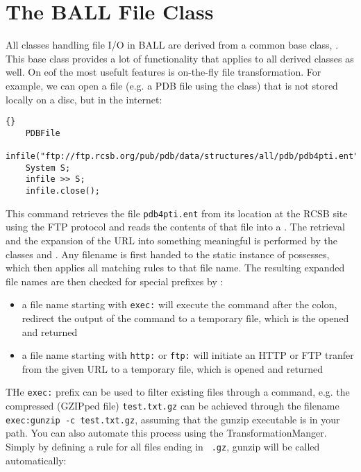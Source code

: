 \section{The BALL File Class}

All classes handling file I/O in BALL are derived from a common
base class, . This base class provides a lot of
functionality that applies to all derived classes as well.
On eof the most usefult features is on-the-fly file transformation.
For example, we can open a file (e.g. a PDB file using the  
class) that is not stored locally on a disc, but in the internet:

\begin{lstlisting}{}
	PDBFile
	infile("ftp://ftp.rcsb.org/pub/pdb/data/structures/all/pdb/pdb4pti.ent");
	System S;
	infile >> S;
	infile.close();
\end{lstlisting}

\noindent
This command retrieves the file {\tt pdb4pti.ent} from its location at the RCSB
site using the FTP protocol and reads the contents of that file into a
. The retrieval and the expansion of the URL into something
meaningful is performed by the classes  and
. Any filename is first handed to the static instance of
  possesses, which then applies all
matching rules to that file name. The resulting expanded file names are then 
checked for special prefixes by :
\begin{itemize}
	\item a file name starting with {\tt exec:} will execute the command after the
					colon, redirect the output of the command to a temporary file, which 	
					is the opened and returned
	\item a file name starting with {\tt http:} or {\tt ftp:} will initiate
					an HTTP or FTP tranfer from the given URL to a temporary file, which
					is opened and returned
\end{itemize}

\noindent 
THe {\tt exec:} prefix can be used to filter existing files through a command, 
e.g. the compressed (GZIPped file) {\tt test.txt.gz} can be achieved through
the filename {\tt exec:gunzip -c test.txt.gz}, assuming that the gunzip
executable is in your path. You can also automate this process using the
TransformationManger. Simply by defining a rule for all files ending in {\tt
.gz}, gunzip will be called automatically:

